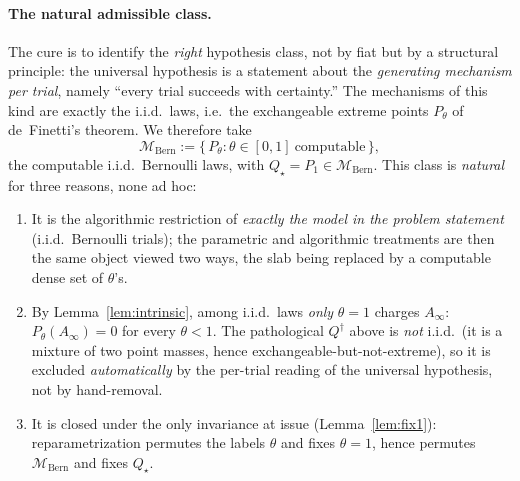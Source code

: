 \documentclass{amsart}
\theoremstyle{definition}
\begin{document}
\paragraph{The natural admissible class.}
The cure is to identify the \emph{right} hypothesis class, not by fiat but by a
structural principle: the universal hypothesis is a statement about the
\emph{generating mechanism per trial}, namely ``every trial succeeds with
certainty.'' The mechanisms of this kind are exactly the i.i.d.\ laws, i.e.\ the
exchangeable extreme points $P_\theta$ of de~Finetti's theorem. We therefore take
\begin{equation}\label{eq:Mbern}
  \mathcal M_{\mathrm{Bern}}
  :=\{\,P_\theta:\theta\in[0,1]\ \text{computable}\,\},
\end{equation}
the computable i.i.d.\ Bernoulli laws, with $Q_\star=P_1\in\mathcal M_{\mathrm{Bern}}$.
This class is \emph{natural} for three reasons, none ad hoc:
\begin{enumerate}
\item[(N1)] It is the algorithmic restriction of \emph{exactly the model in the
problem statement} (i.i.d.\ Bernoulli trials); the parametric and algorithmic
treatments are then the same object viewed two ways, the slab being replaced by a
computable dense set of $\theta$'s.
\item[(N2)] By Lemma~\ref{lem:intrinsic}, among i.i.d.\ laws \emph{only}
$\theta=1$ charges $A_\infty$: $P_\theta(A_\infty)=0$ for every $\theta<1$. The
pathological $Q^{\dagger}$ above is \emph{not} i.i.d.\ (it is a mixture of two
point masses, hence exchangeable-but-not-extreme), so it is excluded
\emph{automatically} by the per-trial reading of the universal hypothesis, not by
hand-removal.
\item[(N3)] It is closed under the only invariance at issue
(Lemma~\ref{lem:fix1}): reparametrization permutes the labels $\theta$ and fixes
$\theta=1$, hence permutes $\mathcal M_{\mathrm{Bern}}$ and fixes $Q_\star$.
\end{enumerate}
\end{document}
